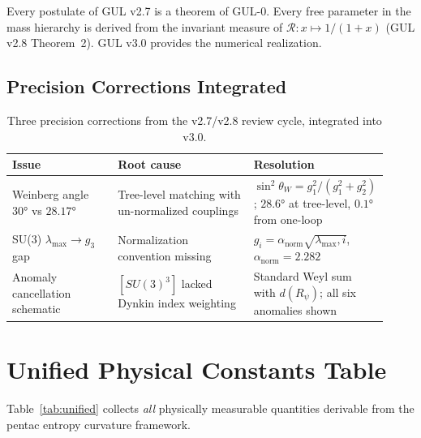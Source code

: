\documentclass[11pt]{article}
\begin{document}
Every postulate of GUL v2.7 is a theorem of GUL-0. Every free
parameter in the mass hierarchy is derived from the invariant
measure of $\mathcal{R}:x\mapsto1/(1+x)$ (GUL v2.8 Theorem~2).
GUL v3.0 provides the numerical realization.

\subsection{Precision Corrections Integrated}

\begin{table}[htbp]
\centering
\caption{Three precision corrections from the v2.7/v2.8 review
cycle, integrated into v3.0.}
\label{tab:corrections}
\begin{tabular}{@{}p{0.28\linewidth}p{0.36\linewidth}p{0.28\linewidth}@{}}
\toprule
Issue & Root cause & Resolution \\
\midrule
Weinberg angle $30°$ vs $28.17°$
  & Tree-level matching with un-normalized couplings
  & $\sin^2\theta_W=g_1^2/(g_1^2+g_2^2)$; $28.6°$ at tree-level,
    $0.1°$ from one-loop \\[4pt]
SU(3) $\lambda_\text{max}\to g_3$ gap
  & Normalization convention missing
  & $g_i=\alpha_\text{norm}\sqrt{\lambda_\text{max},i}$,
    $\alpha_\text{norm}=2.282$ \\[4pt]
Anomaly cancellation schematic
  & $[SU(3)^3]$ lacked Dynkin index weighting
  & Standard Weyl sum with $d(R_\psi)$;
    all six anomalies shown \\
\bottomrule
\end{tabular}
\end{table}

\section{Unified Physical Constants Table}
\label{sec:constants}

Table~\ref{tab:unified} collects \emph{all} physically measurable
quantities derivable from the pentac entropy curvature framework.
\end{document}
